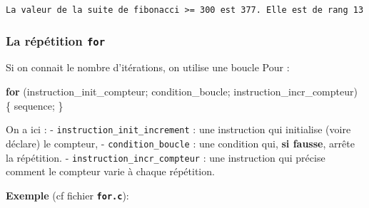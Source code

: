 \documentclass[11pt]{article}
\newenvironment{Shaded}{}{}
\newcommand{\NormalTok}[1]{{#1}}
\newcommand{\ControlFlowTok}[1]{\textcolor[rgb]{0.00,0.44,0.13}{\textbf{{#1}}}}
\begin{document}
    \begin{Verbatim}[commandchars=\\\{\}]
La valeur de la suite de fibonacci >= 300 est 377. Elle est de rang 13
    \end{Verbatim}

    \hypertarget{la-ruxe9puxe9tition-for}{%
\subsubsection{\texorpdfstring{La répétition
\texttt{for}}{La répétition for}}\label{la-ruxe9puxe9tition-for}}

Si on connait le nombre d'itérations, on utilise une boucle Pour :

\begin{Shaded}
\begin{Highlighting}[]
    \ControlFlowTok{for}\NormalTok{ (instruction\_init\_compteur; condition\_boucle; instruction\_incr\_compteur) \{}
\NormalTok{        sequence;}
\NormalTok{    \}}
\end{Highlighting}
\end{Shaded}

On a ici : - \texttt{instruction\_init\_increment} : une instruction qui
initialise (voire déclare) le compteur, - \texttt{condition\_boucle} :
une condition qui, \textbf{si fausse}, arrête la répétition. -
\texttt{instruction\_incr\_compteur} : une instruction qui précise
comment le compteur varie à chaque répétition.

\textbf{Exemple} (cf fichier \textbf{\texttt{for.c}}):
\end{document}
